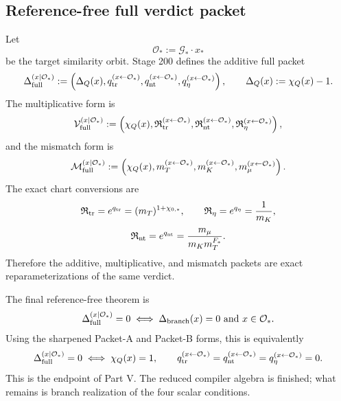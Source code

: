 \subsection{Reference-free full verdict packet}
Let
\begin{equation}
\label{eq:app-part05-target-orbit}
\mathcal O_*:=\mathcal G_*\cdot x_*
\end{equation}
be the target similarity orbit.  Stage 200 defines the additive full packet
\begin{equation}
\label{eq:app-part05-full-packet-additive}
\Delta_{\rm full}^{(x\mid\mathcal O_*)}
:=
\left(
\Delta_Q(x),
q_{\rm tr}^{(x\leftarrow\mathcal O_*)},
q_{\rm nt}^{(x\leftarrow\mathcal O_*)},
q_\eta^{(x\leftarrow\mathcal O_*)}
\right),
\qquad
\Delta_Q(x):=\chi_Q(x)-1.
\end{equation}
The multiplicative form is
\begin{equation}
\label{eq:app-part05-full-packet-multiplicative}
\mathcal V_{\rm full}^{(x\mid\mathcal O_*)}
:=
\left(
\chi_Q(x),
\mathfrak R_{\rm tr}^{(x\leftarrow\mathcal O_*)},
\mathfrak R_{\rm nt}^{(x\leftarrow\mathcal O_*)},
\mathfrak R_\eta^{(x\leftarrow\mathcal O_*)}
\right),
\end{equation}
and the mismatch form is
\begin{equation}
\label{eq:app-part05-full-packet-mismatch}
\mathcal M_{\rm full}^{(x\mid\mathcal O_*)}
:=
\left(
\chi_Q(x),
 m_T^{(x\leftarrow\mathcal O_*)},
 m_K^{(x\leftarrow\mathcal O_*)},
 m_\mu^{(x\leftarrow\mathcal O_*)}
\right).
\end{equation}
The exact chart conversions are
\begin{equation}
\label{eq:app-part05-chart-conversions-1}
\mathfrak R_{\rm tr}=e^{q_{\rm tr}}=(m_T)^{1+\chi_{0,*}},
\qquad
\mathfrak R_\eta=e^{q_\eta}=\frac{1}{m_K},
\end{equation}
\begin{equation}
\label{eq:app-part05-chart-conversions-2}
\mathfrak R_{\rm nt}=e^{q_{\rm nt}}=\frac{m_\mu}{m_Km_T^{F_*}}.
\end{equation}
Therefore the additive, multiplicative, and mismatch packets are exact reparameterizations of the same verdict.

The final reference-free theorem is
\begin{equation}
\label{eq:app-part05-reference-free-home-stretch}
\Delta_{\rm full}^{(x\mid\mathcal O_*)}=0
\iff
\Delta_{\rm branch}(x)=0
\text{ and }
x\in\mathcal O_*.
\end{equation}
Using the sharpened Packet-A and Packet-B forms, this is equivalently
\begin{equation}
\label{eq:app-part05-reference-free-expanded}
\Delta_{\rm full}^{(x\mid\mathcal O_*)}=0
\iff
\chi_Q(x)=1,
\qquad
q_{\rm tr}^{(x\leftarrow\mathcal O_*)}=q_{\rm nt}^{(x\leftarrow\mathcal O_*)}=q_\eta^{(x\leftarrow\mathcal O_*)}=0.
\end{equation}
This is the endpoint of Part V.  The reduced compiler algebra is finished; what remains is branch realization of the four scalar conditions.

